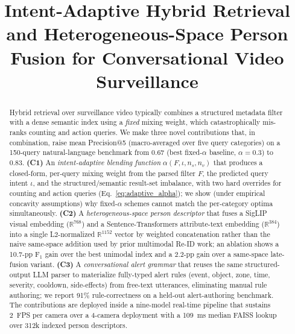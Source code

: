 ﻿\documentclass[conference]{IEEEtran}
\theoremstyle{definition}
\begin{document}
\title{Intent-Adaptive Hybrid Retrieval and Heterogeneous-Space Person Fusion for Conversational Video Surveillance}

\author{
}

\maketitle

\begin{abstract}
Hybrid retrieval over surveillance video typically combines a structured metadata filter with a dense semantic index using a \emph{fixed} mixing weight, which catastrophically mis-ranks counting and action queries. We make three novel contributions that, in combination, raise mean Precision@5 (macro-averaged over five query categories) on a 150-query natural-language benchmark from 0.67 (best fixed-$\alpha$ baseline, $\alpha{=}0.3$) to 0.83. \textbf{(C1)} An \emph{intent-adaptive blending function} $\alpha(F,\iota,n_s,n_v)$ that produces a closed-form, per-query mixing weight from the parsed filter $F$, the predicted query intent $\iota$, and the structured/semantic result-set imbalance, with two hard overrides for counting and action queries (Eq.~\eqref{eq:adaptive_alpha}); we show (under empirical concavity assumptions) why fixed-$\alpha$ schemes cannot match the per-category optima simultaneously. \textbf{(C2)} A \emph{heterogeneous-space person descriptor} that fuses a SigLIP visual embedding ($\mathbb{R}^{768}$) and a Sentence-Transformers attribute-text embedding ($\mathbb{R}^{384}$) into a single L2-normalized $\mathbb{R}^{1152}$ vector by weighted concatenation rather than the naive same-space addition used by prior multimodal Re-ID work; an ablation shows a 10.7-pp F$_1$ gain over the best unimodal index and a 2.2-pp gain over a same-space late-fusion variant. \textbf{(C3)} A \emph{conversational alert grammar} that reuses the same structured-output LLM parser to materialize fully-typed alert rules (event, object, zone, time, severity, cooldown, side-effects) from free-text utterances, eliminating manual rule authoring; we report 91\% rule-correctness on a held-out alert-authoring benchmark. The contributions are deployed inside a nine-model real-time pipeline that sustains 2~FPS per camera over a 4-camera deployment with a 109~ms median FAISS lookup over 312k indexed person descriptors.
\end{abstract}
\end{document}
